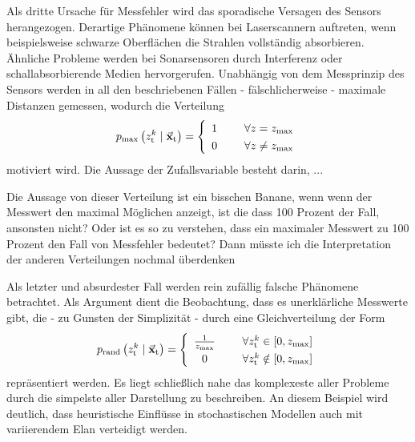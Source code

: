 Als dritte Ursache für Messfehler wird das sporadische Versagen des Sensors herangezogen. Derartige Phänomene können bei Laserscannern auftreten, wenn beispielsweise schwarze Oberflächen die Strahlen vollständig absorbieren. Ähnliche Probleme werden bei Sonarsensoren durch Interferenz oder schallabsorbierende Medien hervorgerufen. Unabhängig von dem Messprinzip des Sensors werden in all den beschriebenen Fällen - fälschlicherweise - maximale Distanzen gemessen, wodurch die Verteilung
\begin{equation}
p\idx{max}\left(z^k\idx{t} \mCond \mVec{x}\idx{t}\right) = \left\{ \begin{array}{cl}
1 & \hspace{5mm} \forall z = z\idx{max} \\
0 & \hspace{5mm} \forall z  \neq z\idx{max}
\end{array}\right.
\end{equation}
motiviert wird. Die Aussage der Zufallsvariable besteht darin, ...

{\color{red} Die Aussage von dieser Verteilung ist ein bisschen Banane, wenn wenn der Messwert den maximal Möglichen anzeigt, ist die dass 100 Prozent der Fall, ansonsten nicht? Oder ist es so zu verstehen, dass ein maximaler Messwert zu 100 Prozent den Fall von Messfehler bedeutet? Dann müsste ich die Interpretation der anderen Verteilungen nochmal überdenken}

Als letzter und absurdester Fall werden rein zufällig falsche Phänomene betrachtet. Als Argument dient die Beobachtung, dass es unerklärliche Messwerte gibt, die - zu Gunsten der Simplizität - durch eine Gleichverteilung der Form
\begin{equation}
\renewcommand*{\arraystretch}{1.3}
p\idx{rand}\left( z^k\idx{t} \mCond \mVec{x}\idx{t}\right) = \left\{ \begin{array}{cl}
\frac{1}{z\idx{max}} & \hspace{5mm} \forall z^k\idx{t} \in \left[0, z\idx{max}\right] 
\\
0 & \hspace{5mm} \forall z^k\idx{t} \notin \left[0, z\idx{max}\right]
\end{array} \right.
\end{equation}
repräsentiert werden. Es liegt schließlich nahe das komplexeste aller Probleme durch die simpelste aller Darstellung zu beschreiben. An diesem Beispiel wird deutlich, dass heuristische Einflüsse in stochastischen Modellen auch mit variierendem Elan verteidigt werden.

